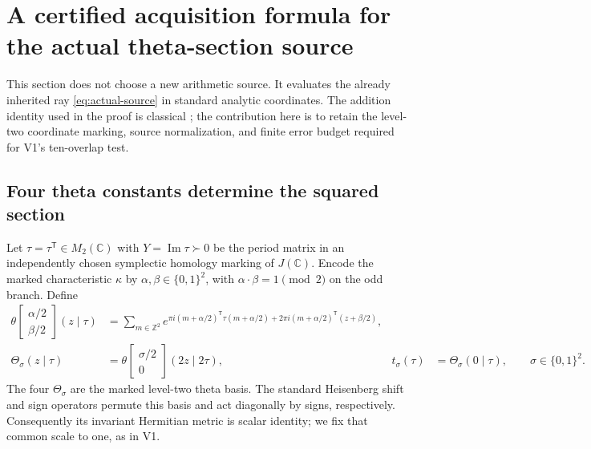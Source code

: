 \documentclass[11pt]{article}
\theoremstyle{definition}
\theoremstyle{remark}
\newcommand{\C}{\mathbb C}
\newcommand{\Z}{\mathbb Z}
\begin{document}
\section{A certified acquisition formula for the actual theta-section source}
\label{sec:v2-theta}

This section does not choose a new arithmetic source. It evaluates the
already inherited ray \eqref{eq:actual-source} in standard analytic
coordinates. The addition identity used in the proof is classical
\cite[\S21.6(ii)]{DLMFTheta}; the contribution here is to retain the
level-two coordinate marking, source normalization, and finite error budget
required for V1's ten-overlap test.

\subsection{Four theta constants determine the squared section}
Let $\tau=\tau^{\mathsf T}\in M_2(\C)$ with $Y=\operatorname{Im}\tau\succ0$
be the period matrix in an independently chosen symplectic homology marking
of $J(\C)$. Encode the marked characteristic $\kappa$ by
$\alpha,\beta\in\{0,1\}^2$, with $\alpha\cdot\beta=1\pmod2$ on the odd
branch. Define
\begin{align}
 \theta\!\begin{bmatrix}\alpha/2\\\beta/2\end{bmatrix}(z\mid\tau)
 &=\sum_{m\in\Z^2}
 e^{\pi i(m+\alpha/2)^{\mathsf T}\tau(m+\alpha/2)
       +2\pi i(m+\alpha/2)^{\mathsf T}(z+\beta/2)},\\
 \Theta_\sigma(z\mid\tau)
 &=\theta\!\begin{bmatrix}\sigma/2\\0\end{bmatrix}(2z\mid2\tau),
 &t_\sigma(\tau)&=\Theta_\sigma(0\mid\tau),
 \qquad\sigma\in\{0,1\}^2.
 \label{eq:v2-theta-definitions}
\end{align}
The four $\Theta_\sigma$ are the marked level-two theta basis. The standard
Heisenberg shift and sign operators permute this basis and act diagonally
by signs, respectively. Consequently its invariant Hermitian metric is
scalar identity; we fix that common scale to one, as in V1.
\end{document}
